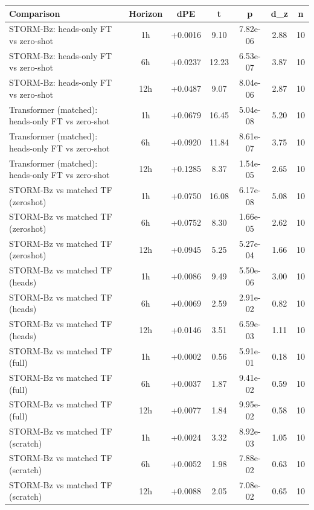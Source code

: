\begin{tabular}{lcccccc}
\toprule
Comparison & Horizon & dPE & t & p & d\_z & n \\
\midrule
STORM-Bz: heads-only FT vs zero-shot & 1h & +0.0016 & 9.10 & 7.82e-06 & 2.88 & 10 \\
STORM-Bz: heads-only FT vs zero-shot & 6h & +0.0237 & 12.23 & 6.53e-07 & 3.87 & 10 \\
STORM-Bz: heads-only FT vs zero-shot & 12h & +0.0487 & 9.07 & 8.04e-06 & 2.87 & 10 \\
Transformer (matched): heads-only FT vs zero-shot & 1h & +0.0679 & 16.45 & 5.04e-08 & 5.20 & 10 \\
Transformer (matched): heads-only FT vs zero-shot & 6h & +0.0920 & 11.84 & 8.61e-07 & 3.75 & 10 \\
Transformer (matched): heads-only FT vs zero-shot & 12h & +0.1285 & 8.37 & 1.54e-05 & 2.65 & 10 \\
STORM-Bz vs matched TF (zeroshot) & 1h & +0.0750 & 16.08 & 6.17e-08 & 5.08 & 10 \\
STORM-Bz vs matched TF (zeroshot) & 6h & +0.0752 & 8.30 & 1.66e-05 & 2.62 & 10 \\
STORM-Bz vs matched TF (zeroshot) & 12h & +0.0945 & 5.25 & 5.27e-04 & 1.66 & 10 \\
STORM-Bz vs matched TF (heads) & 1h & +0.0086 & 9.49 & 5.50e-06 & 3.00 & 10 \\
STORM-Bz vs matched TF (heads) & 6h & +0.0069 & 2.59 & 2.91e-02 & 0.82 & 10 \\
STORM-Bz vs matched TF (heads) & 12h & +0.0146 & 3.51 & 6.59e-03 & 1.11 & 10 \\
STORM-Bz vs matched TF (full) & 1h & +0.0002 & 0.56 & 5.91e-01 & 0.18 & 10 \\
STORM-Bz vs matched TF (full) & 6h & +0.0037 & 1.87 & 9.41e-02 & 0.59 & 10 \\
STORM-Bz vs matched TF (full) & 12h & +0.0077 & 1.84 & 9.95e-02 & 0.58 & 10 \\
STORM-Bz vs matched TF (scratch) & 1h & +0.0024 & 3.32 & 8.92e-03 & 1.05 & 10 \\
STORM-Bz vs matched TF (scratch) & 6h & +0.0052 & 1.98 & 7.88e-02 & 0.63 & 10 \\
STORM-Bz vs matched TF (scratch) & 12h & +0.0088 & 2.05 & 7.08e-02 & 0.65 & 10 \\
\bottomrule
\end{tabular}
